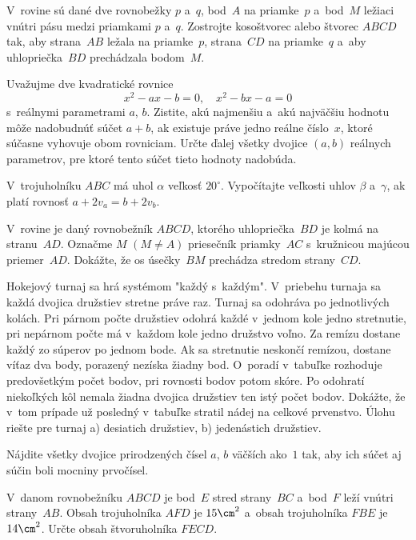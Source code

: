 {%
V~rovine sú dané dve rovnobežky $p$ a~$q$, bod~$A$
na priamke~$p$ a~bod~$M$ ležiaci vnútri
pásu medzi priamkami $p$ a~$q$. Zostrojte
kosoštvorec alebo štvorec $ABCD$ tak, aby strana~$AB$ ležala na priamke~$p$, strana~$CD$ na
priamke~$q$ a~aby uhlopriečka~$BD$ prechádzala
bodom~$M$.}

{%
Uvažujme dve kvadratické rovnice
$$
x^2-ax-b=0,\quad x^2-bx-a=0
$$
s~reálnymi parametrami $a$, $b$. Zistite, akú najmenšiu a~akú najväčšiu hodnotu môže nadobudnúť súčet $a+b$, ak existuje práve jedno reálne číslo~$x$, ktoré súčasne vyhovuje obom rovniciam. Určte ďalej všetky dvojice $(a,b)$ reálnych parametrov, pre ktoré tento súčet tieto hodnoty nadobúda.}

{%
V~trojuholníku $ABC$ má uhol $\alpha$ veľkosť $20^\circ$. Vypočítajte veľkosti uhlov $\beta$ a~$\gamma$, ak platí rovnosť $a+2v_a=b+2v_b$.}

{%
V~rovine je daný rovnobežník $ABCD$, ktorého uhlopriečka~$BD$ je kolmá na stranu~$AD$. Označme $M$ $(M\ne A)$ priesečník priamky~$AC$ s~kružnicou majúcou priemer~$AD$. Dokážte, že os úsečky~$BM$ prechádza stredom strany~$CD$.}

{%
Hokejový turnaj sa hrá systémom "každý s~každým". V~priebehu turnaja sa každá dvojica družstiev stretne práve raz. Turnaj sa odohráva po jednotlivých kolách. Pri párnom počte družstiev odohrá každé v~jednom kole jedno stretnutie, pri nepárnom počte má v~každom kole jedno družstvo voľno. Za remízu dostane každý zo súperov po jednom bode. Ak sa stretnutie neskončí remízou, dostane víťaz dva body, porazený nezíska žiadny bod. O~poradí v~tabuľke rozhoduje predovšetkým počet bodov, pri rovnosti bodov potom skóre. Po odohratí niekoľkých kôl nemala žiadna dvojica družstiev ten istý počet bodov. Dokážte, že v~tom prípade už posledný v~tabuľke stratil nádej na celkové prvenstvo. Úlohu riešte pre turnaj
\ite a) desiatich družstiev,
\ite b) jedenástich družstiev.}

{%
Nájdite všetky dvojice prirodzených čísel
$a$, $b$ väčších ako~$1$ tak, aby ich
súčet aj súčin boli mocniny prvočísel.}

{%
V~danom rovnobežníku $ABCD$ je bod~$E$ stred
strany~$BC$ a~bod~$F$ leží vnútri strany~$AB$.
Obsah trojuholníka $AFD$ je $15\cm^2$
a~obsah trojuholníka $FBE$ je $14\cm^2$.
Určte obsah štvoruholníka $FECD$.}

